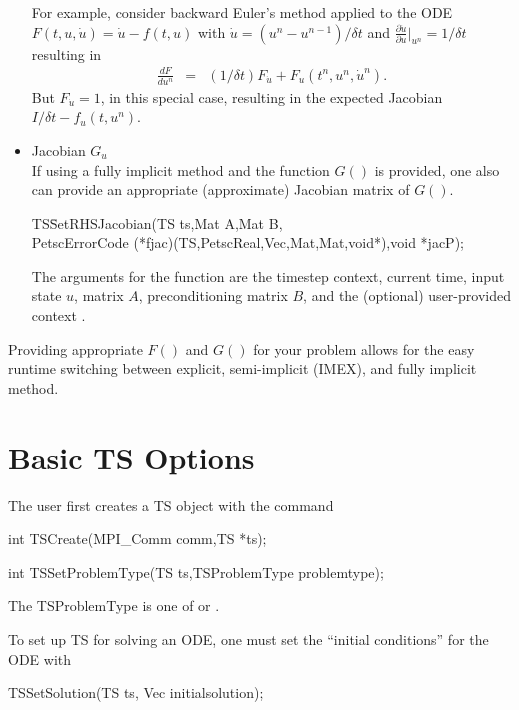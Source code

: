 \begin{itemize}
  For example, consider backward Euler's method applied to the ODE $ F(t, u, \dot{u}) = \dot{u} - f(t, u) $ with $ \dot{u} = (u^n - u^{n-1})/\delta t$ and
$ \frac{\partial \dot{u}}{\partial u}|_{u^n} = 1/\delta t $ resulting in
\begin{eqnarray*}
    \frac{d F}{d u^n} & = &   (1/\delta t)F_{\dot{u}} + F_u(t^n,u^n,\dot{u}^n).
\end{eqnarray*}
But $ F_{\dot{u}} = 1 $, in this special case, resulting in the expected Jacobian $ I/\delta t - f_u(t,u^n)$.

\item Jacobian $G_u$ \\
  If using a fully implicit method and the function $ G() $ is provided, one also can provide an appropriate (approximate) Jacobian matrix of $G()$.
  \begin{tabbing}
    TS\=SetRHSJacobian(TS ts,Mat A,Mat B,\\
    \>PetscErrorCode (*fjac)(TS,PetscReal,Vec,Mat,Mat,void*),void *jacP);
  \end{tabbing}
  The arguments for the function 
  are the timestep context, current time, input state $u$, matrix $A$, preconditioning matrix
  $B$, and the (optional) user-provided context .
\end{itemize}

Providing appropriate $ F() $ and $G() $ for your problem allows for the easy runtime switching between explicit, semi-implicit (IMEX), and fully implicit method.

\section{Basic TS Options}

The user first creates a TS object with the command
\begin{tabbing}
  int TSCreate(MPI\_Comm comm,TS *ts);
\end{tabbing}

\begin{tabbing}
  int TSSetProblemType(TS ts,TSProblemType problemtype);
\end{tabbing}
The TSProblemType
is one of  or .

\noindent To set up TS for solving an ODE, one must set the ``initial conditions'' for the ODE with
\begin{tabbing}
 TSSetSolution(TS ts, Vec initialsolution);
\end{tabbing}

